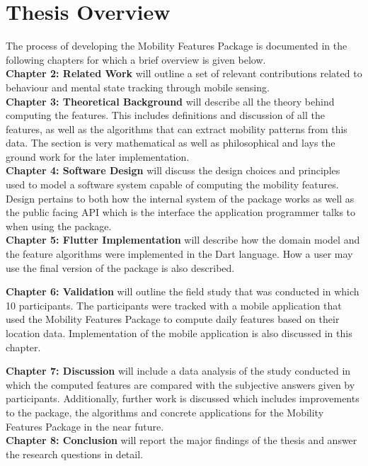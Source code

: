 \section{Thesis Overview}

The process of developing the Mobility Features Package is documented in the following chapters for which a brief overview is given below.\\

\textbf{Chapter 2: Related Work} will outline a set of relevant contributions related to behaviour and mental state tracking through mobile sensing. \\

\textbf{Chapter 3: Theoretical Background} will describe all the theory behind computing the features. This includes definitions and discussion of all the features, as well as the algorithms that can extract mobility patterns from this data. The section is very mathematical as well as philosophical and lays the ground work for the later implementation.\\

\textbf{Chapter 4: Software Design} will discuss the design choices and principles used to model a software system capable of computing the mobility features. Design pertains to both how the internal system of the package works as well as the public facing API which is the interface the application programmer talks to when using the package.\\

\textbf{Chapter 5: Flutter Implementation} will describe how the domain model and the feature algorithms were implemented in the Dart language. How a user may use the final version of the package is also described.

\textbf{Chapter 6: Validation} will outline the field study that was conducted in which 10 participants. The participants were tracked with a mobile application that used the Mobility Features Package to compute daily features based on their location data. Implementation of the mobile application is also discussed in this chapter.

\textbf{Chapter 7: Discussion} will include a data analysis of the study conducted in which the computed features are compared with the subjective answers given by participants. Additionally, further work is discussed which includes improvements to the package, the algorithms and concrete applications for the Mobility Features Package in the near future.\\

\textbf{Chapter 8: Conclusion} will report the major findings of the thesis and answer the research questions in detail.\\